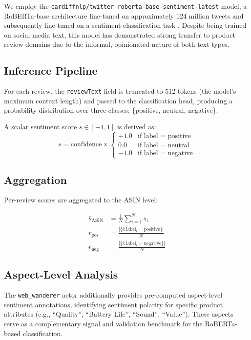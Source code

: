 We employ the \texttt{cardiffnlp/twitter-roberta-base-sentiment-latest} model, a
RoBERTa-base architecture fine-tuned on approximately 124 million tweets and subsequently
fine-tuned on a sentiment classification task \cite{loureiro2022timelms}. Despite being
trained on social media text, this model has demonstrated strong transfer to product
review domains due to the informal, opinionated nature of both text types.

\subsection{Inference Pipeline}

For each review, the \texttt{reviewText} field is truncated to 512 tokens (the model's
maximum context length) and passed to the classification head, producing a probability
distribution over three classes: \{positive, neutral, negative\}.

A scalar sentiment score $s \in [-1, 1]$ is derived as:
\begin{equation}
  s = \text{confidence} \times
  \begin{cases}
    +1.0 & \text{if label = positive} \\
     0.0 & \text{if label = neutral} \\
    -1.0 & \text{if label = negative}
  \end{cases}
\end{equation}

\subsection{Aggregation}

Per-review scores are aggregated to the ASIN level:

\begin{align}
  \bar{s}_{\text{ASIN}} &= \frac{1}{N} \sum_{i=1}^{N} s_i \\
  r_{\text{pos}}        &= \frac{|\{i : \text{label}_i = \text{positive}\}|}{N} \\
  r_{\text{neg}}        &= \frac{|\{i : \text{label}_i = \text{negative}\}|}{N}
\end{align}

\subsection{Aspect-Level Analysis}

The \texttt{web\_wanderer} actor additionally provides pre-computed aspect-level
sentiment annotations, identifying sentiment polarity for specific product attributes
(e.g., ``Quality'', ``Battery Life'', ``Sound'', ``Value''). These aspects serve as a
complementary signal and validation benchmark for the RoBERTa-based classification.


